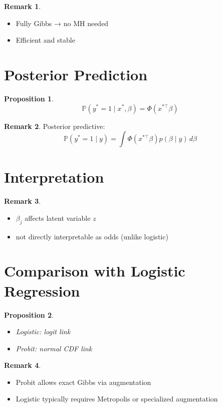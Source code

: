 \documentclass[12pt,oneside]{book}
\numberwithin{equation}{section}
\theoremstyle{definition}
\newtheorem{remark}{Remark}[section]
\theoremstyle{plain}
\newtheorem{proposition}{Proposition}[section]
\theoremstyle{remark}
\newcommand{\Prob}{\mathbb{P}}
\begin{document}
\begin{remark}
\begin{itemize}
\item Fully Gibbs → no MH needed
\item Efficient and stable
\end{itemize}
\end{remark}

\section{Posterior Prediction}

\begin{proposition}
$$
\Prob(y^\ast = 1 \mid x^\ast, \beta)
=
\Phi(x^{\ast \top}\beta)
$$
\end{proposition}

\begin{remark}
Posterior predictive:
$$
\Prob(y^\ast = 1 \mid y)
=
\int \Phi(x^{\ast \top}\beta) p(\beta \mid y)\, d\beta
$$
\end{remark}

\section{Interpretation}

\begin{remark}
\begin{itemize}
\item $\beta_j$ affects latent variable $z$
\item not directly interpretable as odds (unlike logistic)
\end{itemize}
\end{remark}

\section{Comparison with Logistic Regression}

\begin{proposition}
\begin{itemize}
\item Logistic: logit link
\item Probit: normal CDF link
\end{itemize}
\end{proposition}

\begin{remark}
\begin{itemize}
\item Probit allows exact Gibbs via augmentation
\item Logistic typically requires Metropolis or specialized augmentation
\end{itemize}
\end{remark}
\end{document}
